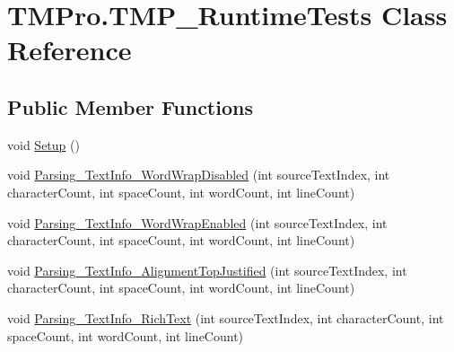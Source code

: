 \hypertarget{class_t_m_pro_1_1_t_m_p___runtime_tests}{}\section{T\+M\+Pro.\+T\+M\+P\+\_\+\+Runtime\+Tests Class Reference}
\label{class_t_m_pro_1_1_t_m_p___runtime_tests}
\subsection*{Public Member Functions}
\begin{DoxyCompactItemize}
\item 
void \mbox{\hyperlink{class_t_m_pro_1_1_t_m_p___runtime_tests_a65b1837dfbcfeed261f6e914e69d7255}{Setup}} ()
\item 
void \mbox{\hyperlink{class_t_m_pro_1_1_t_m_p___runtime_tests_ad1cc7bb34ebedc169d5e61d1f729c429}{Parsing\+\_\+\+Text\+Info\+\_\+\+Word\+Wrap\+Disabled}} (int source\+Text\+Index, int character\+Count, int space\+Count, int word\+Count, int line\+Count)
\item 
void \mbox{\hyperlink{class_t_m_pro_1_1_t_m_p___runtime_tests_a96aa93e70f25ce98e594b1b8740a49b3}{Parsing\+\_\+\+Text\+Info\+\_\+\+Word\+Wrap\+Enabled}} (int source\+Text\+Index, int character\+Count, int space\+Count, int word\+Count, int line\+Count)
\item 
void \mbox{\hyperlink{class_t_m_pro_1_1_t_m_p___runtime_tests_a56adfe646fa31d5139bdf0843521badf}{Parsing\+\_\+\+Text\+Info\+\_\+\+Alignment\+Top\+Justified}} (int source\+Text\+Index, int character\+Count, int space\+Count, int word\+Count, int line\+Count)
\item 
void \mbox{\hyperlink{class_t_m_pro_1_1_t_m_p___runtime_tests_a283147fa72ae8e15d16ea84b389271a0}{Parsing\+\_\+\+Text\+Info\+\_\+\+Rich\+Text}} (int source\+Text\+Index, int character\+Count, int space\+Count, int word\+Count, int line\+Count)
\end{DoxyCompactItemize}
